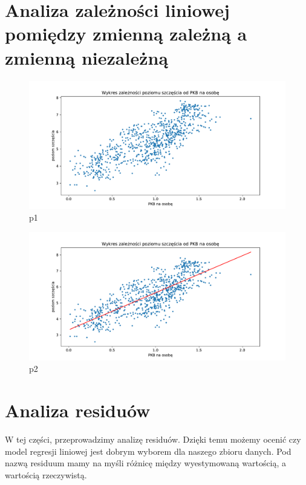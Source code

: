 \documentclass{article}
\theoremstyle{break}
\begin{document}
\section{Analiza zależności liniowej pomiędzy zmienną zależną a zmienną niezależną}

\begin{figure}[H]
	\begin{center}
		\includegraphics[scale=0.43]{plot1.pdf}
		\caption{p1}
		\label{fig:plot1}
	\end{center}
\end{figure}

\begin{figure}[H]
	\begin{center}
		\includegraphics[scale=0.43]{plot2.pdf}
		\caption{p2}
		\label{fig:plot2}
	\end{center}
\end{figure}
	
\section{Analiza residuów}

W tej części, przeprowadzimy analizę residuów. Dzięki temu możemy ocenić czy model regresji liniowej jest dobrym wyborem dla naszego zbioru danych. Pod nazwą residuum mamy na myśli różnicę między wyestymowaną wartością, a wartością rzeczywistą.
\end{document}
